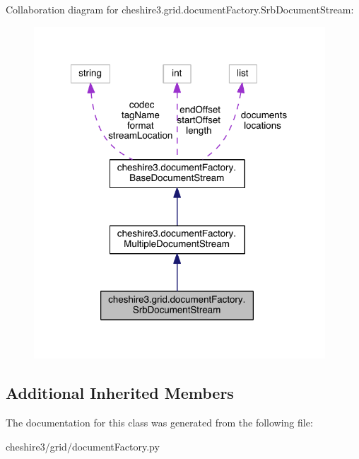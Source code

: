 Collaboration diagram for cheshire3.\-grid.\-document\-Factory.\-Srb\-Document\-Stream\-:
\nopagebreak
\begin{figure}[H]
\begin{center}
\leavevmode
\includegraphics[width=309pt]{classcheshire3_1_1grid_1_1document_factory_1_1_srb_document_stream__coll__graph}
\end{center}
\end{figure}
\subsection*{Additional Inherited Members}


The documentation for this class was generated from the following file\-:\begin{DoxyCompactItemize}
\item 
cheshire3/grid/document\-Factory.\-py\end{DoxyCompactItemize}
